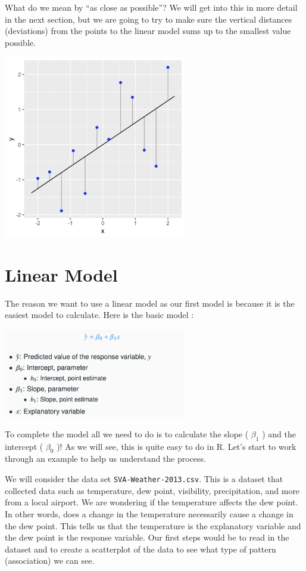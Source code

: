 \documentclass[
  letterpaper,
  DIV=11,
  numbers=noendperiod]{scrreprt}
\begin{document}
What do we mean by ``as close as possible''? We will get into this in
more detail in the next section, but we are going to try to make sure
the vertical distances (deviations) from the points to the linear model
sums up to the smallest value possible.

\includegraphics[width=0.6\textwidth,height=\textheight]{./images/LMR_2.jpg}

\section*{Linear Model}\label{linear-model}


The reason we want to use a linear model as our first model is because
it is the easiest model to calculate. Here is the basic model :

\includegraphics[width=0.6\textwidth,height=\textheight]{./images/LMR_3.jpg}

To complete the model all we need to do is to calculate the slope (
\(\beta_1\) ) and the intercept ( \(\beta_0\) )! As we will see, this is
quite easy to do in R. Let's start to work through an example to help us
understand the process.

We will consider the data set \texttt{SVA-Weather-2013.csv}. This is a
dataset that collected data such as temperature, dew point, visibility,
precipitation, and more from a local airport. We are wondering if the
temperature affects the dew point. In other words, does a change in the
temperature necessarily cause a change in the dew point. This tells us
that the temperature is the explanatory variable and the dew point is
the response variable. Our first steps would be to read in the dataset
and to create a scatterplot of the data to see what type of pattern
(association) we can see.
\end{document}
